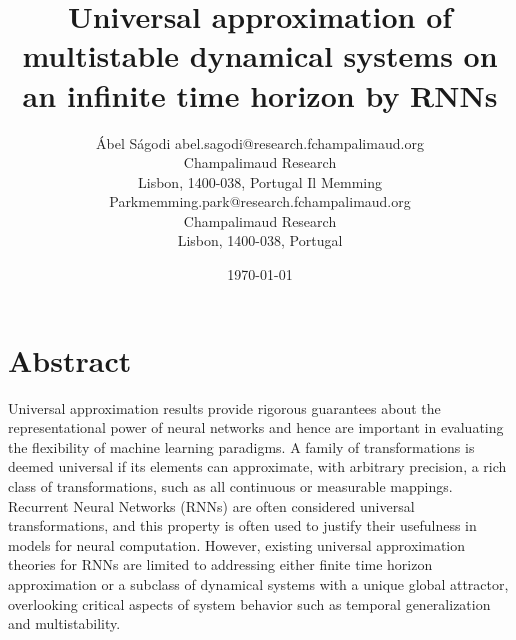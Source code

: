 \documentclass{article}
\newcounter{ct}
\begin{document}
\title{Universal approximation of multistable dynamical systems on an infinite time horizon by RNNs}

\author{\name \'Abel S\'agodi \email abel.sagodi@research.fchampalimaud.org\\
       \addr
       Champalimaud Research\\
       Lisbon, 1400-038, Portugal
       \AND
       \name Il Memming Park\email memming.park@research.fchampalimaud.org \\
       \addr 
       Champalimaud Research\\
       Lisbon, 1400-038, Portugal}


\date{\today}


\maketitle

\section*{Abstract}
Universal approximation results provide rigorous guarantees about the representational power of neural networks and hence are important in evaluating the flexibility of machine learning paradigms. A family of transformations is deemed universal if its elements can approximate, with arbitrary precision, a rich class of transformations, such as all continuous or measurable mappings. Recurrent Neural Networks (RNNs) are often considered universal transformations, and this property is often used to justify their usefulness in models for neural computation. However, existing universal approximation theories for RNNs are limited to addressing either finite time horizon approximation or a subclass of dynamical systems with a unique global attractor, overlooking critical aspects of system behavior such as temporal generalization and multistability.

\end{document}
